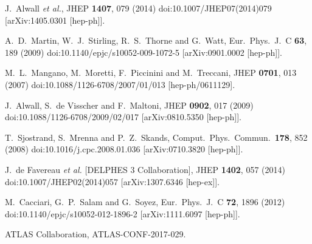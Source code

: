 \documentclass{ws-mpla}
\begin{document}
\begin{thebibliography}{99}
  J.~Alwall {\it et al.},
  JHEP {\bf 1407}, 079 (2014)
  doi:10.1007/JHEP07(2014)079
  [arXiv:1405.0301 [hep-ph]].
    
  A.~D.~Martin, W.~J.~Stirling, R.~S.~Thorne and G.~Watt,
  Eur.\ Phys.\ J.\ C {\bf 63}, 189 (2009)
  doi:10.1140/epjc/s10052-009-1072-5
  [arXiv:0901.0002 [hep-ph]].
  
  M.~L.~Mangano, M.~Moretti, F.~Piccinini and M.~Treccani,
  JHEP {\bf 0701}, 013 (2007)
  doi:10.1088/1126-6708/2007/01/013
  [hep-ph/0611129].

  J.~Alwall, S.~de Visscher and F.~Maltoni,
  JHEP {\bf 0902}, 017 (2009)
  doi:10.1088/1126-6708/2009/02/017
  [arXiv:0810.5350 [hep-ph]].

  T.~Sjostrand, S.~Mrenna and P.~Z.~Skands,
  Comput.\ Phys.\ Commun.\  {\bf 178}, 852 (2008)
  doi:10.1016/j.cpc.2008.01.036
  [arXiv:0710.3820 [hep-ph]].

  J.~de Favereau {\it et al.} [DELPHES 3 Collaboration],
  JHEP {\bf 1402}, 057 (2014)
  doi:10.1007/JHEP02(2014)057
  [arXiv:1307.6346 [hep-ex]].

  M.~Cacciari, G.~P.~Salam and G.~Soyez,
  Eur.\ Phys.\ J.\ C {\bf 72}, 1896 (2012)
  doi:10.1140/epjc/s10052-012-1896-2
  [arXiv:1111.6097 [hep-ph]].

  ATLAS Collaboration,
  ATLAS-CONF-2017-029.
\end{thebibliography}
\end{document}
